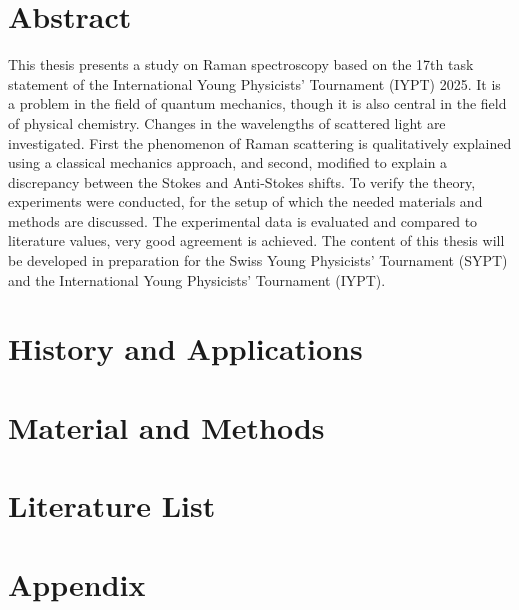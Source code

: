 \documentclass[a4paper]{article}
\begin{document}
\section*{Abstract}

This thesis presents a study on Raman spectroscopy based on the 17th task statement of the International Young Physicists' Tournament (IYPT) 2025. It is a problem in the field of quantum mechanics, though it is also central in the field of physical chemistry. Changes in the wavelengths of scattered light are investigated. First the phenomenon of Raman scattering is qualitatively explained using a classical mechanics approach, and second, modified to explain a discrepancy between the Stokes and Anti-Stokes shifts. To verify the theory, experiments were conducted, for the setup of which the needed materials and methods are discussed. The experimental data is evaluated and compared to literature values, very good agreement is achieved. The content of this thesis will be developed in preparation for the Swiss Young Physicists' Tournament (SYPT) and the International Young Physicists' Tournament (IYPT).

\newpage



\newpage
\tableofcontents
\newpage




\section{History and Applications}\label{hist_app}

\newpage


\newpage

\section{Material and Methods}\label{mat_met}

\newpage



\newpage


\newpage



\newpage

\section*{Literature List}
\printbibliography

\newpage

\section{Appendix}

\end{document}
